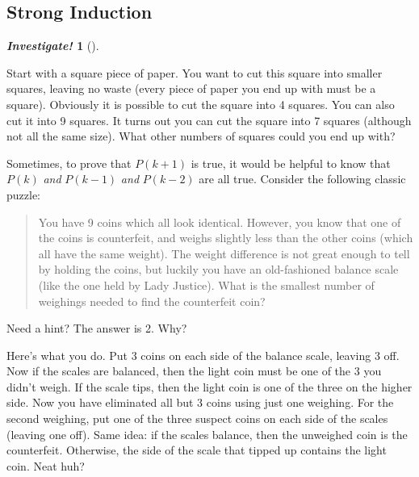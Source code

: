 \documentclass[10pt,]{book}
\theoremstyle{plain}
\theoremstyle{definition}
\theoremstyle{definition}
\newtheorem{investigation}[project]{\emph{Investigate!}}
\theoremstyle{definition}
\numberwithin{equation}{chapter}
\begin{document}
\subsection[Strong Induction]{Strong Induction}\label{subsec_induction-strong}
\begin{investigation}[]\label{investigation-23}

Start with a square piece of paper. You want to cut this square into smaller squares, leaving no waste (every piece of paper you end up with must be a square). Obviously it is possible to cut the square into 4 squares. You can also cut it into 9 squares. It turns out you can cut the square into 7 squares (although not all the same size). What other numbers of squares could you end up with?
%
\end{investigation}

Sometimes, to prove that \(P(k+1)\) is true, it would be helpful to know that \(P(k)\) \emph{and} \(P(k-1)\) \emph{and} \(P(k-2)\) are all true. Consider the following classic puzzle:
%
\par

\begin{quote}
You have 9 coins which all look identical.  However, you know that one of the coins is counterfeit, and weighs slightly less than the other coins (which all have the same weight).  The weight difference is not great enough to tell by holding the coins, but luckily you have an old-fashioned balance scale (like the one held by Lady Justice).  What is the smallest number of weighings needed to find the counterfeit coin?
\end{quote}

%
\par

Need a hint? The answer is 2. Why?
%
\par

Here's what you do. Put 3 coins on each side of the balance scale, leaving 3 off. Now if the scales are balanced, then the light coin must be one of the 3 you didn't weigh. If the scale tips, then the light coin is one of the three on the higher side. Now you have eliminated all but 3 coins using just one weighing. For the second weighing, put one of the three suspect coins on each side of the scales (leaving one off). Same idea: if the scales balance, then the unweighed coin is the counterfeit. Otherwise, the side of the scale that tipped up contains the light coin. Neat huh?
%
\par
\end{document}
